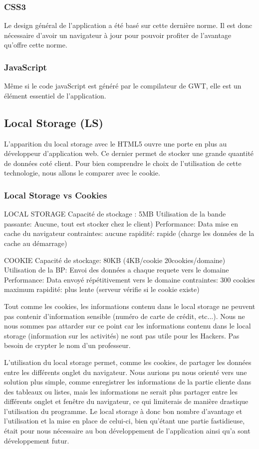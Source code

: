 \subsubsection{CSS3}
Le design général de l'application a été basé sur cette dernière norme. Il est donc nécessaire d'avoir un navigateur à jour pour pouvoir profiter de l'avantage qu'offre cette norme.

\subsubsection{JavaScript}
Même si le code javaScript est généré par le compilateur de GWT, elle est un élément essentiel de l'application. 
 
\subsection{Local Storage (LS)}
L'apparition du local storage avec le HTML5 ouvre une porte en plus au développeur d'application web. Ce dernier permet de stocker une grande quantité de données coté client. Pour bien comprendre le choix de l'utilisation de cette technologie, nous allons le comparer avec le cookie.

\subsubsection{Local Storage vs Cookies}

LOCAL STORAGE
Capacité de stockage : 5MB
Utilisation de la bande passante: Aucune, tout est stocker chez le client)
Performance: Data mise en cache du navigateur
contraintes: aucune
rapidité: rapide (charge les données de la cache au démarrage)

COOKIE
Capacité de stockage: 80KB (4KB/cookie 20cookies/domaine)
Utilisation de la BP: Envoi des données a chaque requete vers le domaine
Performance: Data envoyé répétitivement vers le domaine
contraintes: 300 cookies maximum
rapidité: plus lente (serveur vérifie si le cookie existe)

Tout comme les cookies, les informations contenu dans le local storage ne peuvent pas contenir d'information sensible (numéro de carte de crédit, etc...). Nous ne nous sommes pas attarder sur ce point car les informations contenu dans le local storage (information sur les activités) ne sont pas utile pour les Hackers. Pas besoin de crypter le nom d'un professeur. 

L'utilisation du local storage permet, comme les cookies, de partager les données entre les différents onglet du navigateur. Nous aurions pu nous orienté vers une solution plus simple, comme enregistrer les informations de la partie cliente dans des tableaux ou listes, mais les informations ne serait plus partager entre les différents onglet et fenêtre du navigateur, ce qui limiterais de manière drastique l'utilisation du programme. Le local storage à donc bon nombre d'avantage et l'utilisation et la mise en place de celui-ci, bien qu'étant une partie fastidieuse, était pour nous nécessaire au bon développement de l'application ainsi qu'a sont développement futur.

